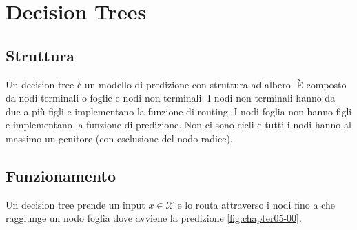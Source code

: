 \chapter{Decision Trees}

\section{Struttura}
Un decision tree \`e un modello di predizione con struttura ad albero.
\`E composto da nodi terminali o foglie e nodi non terminali.
I nodi non terminali hanno da due a pi\`u figli e implementano la funzione di routing.
I nodi foglia non hanno figli e implementano la funzione di predizione.
Non ci sono cicli e tutti i nodi hanno al massimo un genitore (con esclusione del nodo radice).

\section{Funzionamento}
Un decision tree prende un input $x\in\mathcal{X}$ e lo routa attraverso i nodi fino a che raggiunge un nodo foglia dove avviene la predizione \ref{fig:chapter05-00}. 

